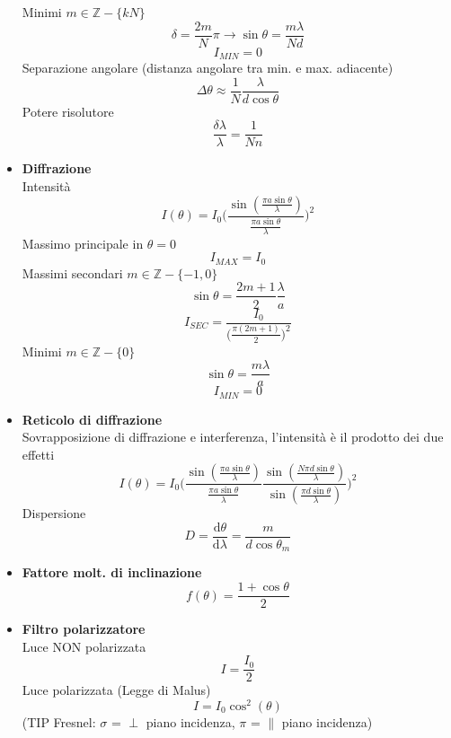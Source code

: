 \documentclass{book}
\newcommand{\g}{\textbf}
\newcommand{\e}{\begin{equation}}
\newcommand{\ex}{\end{equation} }
\renewcommand{\it}{\item[$\cdot$]}
\begin{document}
\begin{multicols}{4}
\begin{itemize}
        Minimi $m\in\mathbb{Z}-\{kN\}$
        \e{\delta=\frac{2m}{N}\pi \rightarrow \sin\theta=\frac{m\lambda}{Nd}} \ex
        \e{I_{MIN}=0}\ex
        Separazione angolare (distanza angolare tra min. e max. adiacente)
        \e{\Delta\theta\approx\frac{1}{N}\frac{\lambda}{d \cos \theta}}\ex
        Potere risolutore
        \e{\frac{\delta\lambda}{\lambda}=\frac{1}{Nn}}\ex
    \it \g{Diffrazione} \\
        Intensità
        \e{I(\theta)=I_{0}\biggl(\frac{\sin(\frac{\pi a \sin\theta}{\lambda})}{\frac{\pi a \sin\theta}{\lambda}} \biggr)^2} \ex
        Massimo principale in $\theta=0$ \\
        \e{I_{MAX}=I_0} \ex
        Massimi secondari $m\in\mathbb{Z}-\{-1,0\}$
        \e{\sin\theta=\frac{2m+1}{2}\frac{\lambda}{a}} \ex
        \e{I_{SEC}=\frac{I_0}{\bigl( \frac{\pi(2m+1)}{2} \bigr)^2}} \ex
        Minimi $m\in\mathbb{Z}-\{0\}$
        \e{\sin\theta=\frac{m\lambda}{a}}\ex
        \e{I_{MIN}=0}\ex
    \it \g{Reticolo di diffrazione} \\
        Sovrapposizione di diffrazione e interferenza, l'intensità è il prodotto dei due effetti \\
        \e{I(\theta)=I_0 \biggl( \frac{\sin(\frac{\pi a \sin\theta}{\lambda})}{\frac{\pi a \sin\theta}{\lambda}} 
        \frac{\sin(\frac{N\pi d \sin\theta}{\lambda})}{\sin(\frac{\pi d \sin\theta}{\lambda})}   \biggr)^2}\ex
        Dispersione
        \e{D=\frac{\mathrm{d}\theta}{\mathrm{d}\lambda}=\frac{m}{d\cos\theta_m}}\ex
    \it \g{Fattore molt. di inclinazione}
        \e{f(\theta)=\frac{1+\cos{\theta}}{2}}\ex
    \it \g{Filtro polarizzatore} \\
        Luce NON polarizzata
        \e{I=\frac{I_0}{2}}\ex
        Luce polarizzata (Legge di Malus)
        \e{I=I_0\cos^2(\theta)}\ex
        (TIP Fresnel: $\sigma$ = $\perp$ piano incidenza, $\pi$ = $\parallel$ piano incidenza)
\end{itemize}
\end{multicols}
\end{document}

